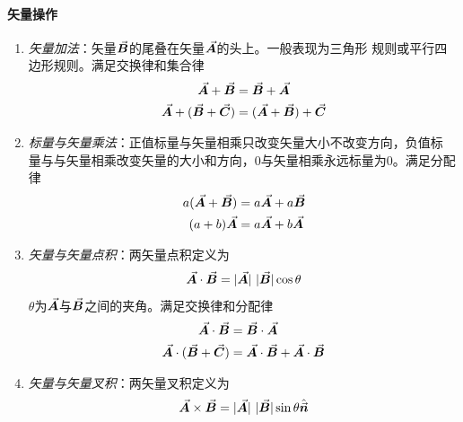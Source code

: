 \paragraph*{矢量操作}
\begin{enumerate}
    \item \textit{矢量加法}：矢量$\vec{\bm{B}}$的尾叠在矢量$\vec{\bm{A}}$的头上。一般表现为三角形
          规则或平行四边形规则。满足交换律和集合律
          \begin{align}
              \vec{\bm{A}} + \vec{\bm{B}} &= \vec{\bm{B}} + \vec{\bm{A}}
                                          \label{eq:vec-vec-add-exchang} \\
              \vec{\bm{A}} + (\vec{\bm{B}} + \vec{\bm{C}}) &= (\vec{\bm{A}} + \vec{\bm{B}}) + \vec{\bm{C}}
                                          \label{eq:vec-vec-add-combine}
          \end{align}
    \item \textit{标量与矢量乘法}：正值标量与矢量相乘只改变矢量大小不改变方向，负值标
          量与与矢量相乘改变矢量的大小和方向，$0$与矢量相乘永远标量为0。满足分配律
          \begin{equation}
              \begin{aligned}
                  a(\vec{\bm{A}} + \vec{\bm{B}}) &= a\vec{\bm{A}} + a\vec{\bm{B}} \\
                  (a + b) \vec{\bm{A}}     &= a\vec{\bm{A}} + b\vec{\bm{A}}
              \end{aligned}
            \label{eq:vec-distri}
          \end{equation}
    \item \textit{矢量与矢量点积}：两矢量点积定义为
           \begin{equation}
               \vec{\bm{A}} \cdot \vec{\bm{B}} = |\vec{\bm{A}}|\ |\vec{\bm{B}}|\cos{\theta}
            \label{eq:vec-dotproduct}
           \end{equation}
           $\theta$为$\vec{\bm{A}}$与$\vec{\bm{B}}$之间的夹角。满足交换律和分配律
           \begin{align}
               \vec{\bm{A}} \cdot \vec{\bm{B}} &= \vec{\bm{B}} \cdot \vec{\bm{A}}
                                           \label{eq:vec-vec-dot-exchange}   \\
               \vec{\bm{A}} \cdot (\vec{\bm{B}} + \vec{\bm{C}}) &= \vec{\bm{A}} \cdot \vec{\bm{B}} + \vec{\bm{A}} \cdot \vec{\bm{B}}
                                           \label{eq:vec-vec-dot-distri}
           \end{align}
    \item \textit{矢量与矢量叉积}：两矢量叉积定义为
          \begin{equation}
              \vec{\bm{A}} \times \vec{\bm{B}} = |\vec{\bm{A}}|\ |\vec{\bm{B}}|\sin{\theta} \hat{\vec{\bm{n}}}
            \label{eq:vec-vec-cross}
          \end{equation}

\end{enumerate}
